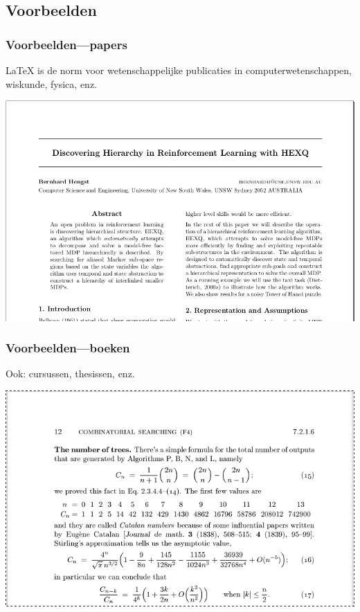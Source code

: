 \documentclass{beamer}
\begin{document}
\begin{frame}
\begin{columns}[c]
  \end{columns}
\end{frame}

\subsection{Voorbeelden}

\begin{frame}
  \frametitle{Voorbeelden---papers}

  {\LaTeX} is de norm voor wetenschappelijke publicaties in computerwetenschappen, wiskunde, fysica, enz.

  \begin{center}
  \includegraphics[height=.6\textheight]{img/oef1-03}
  \end{center}

\end{frame}

\begin{frame}
  \frametitle{Voorbeelden---boeken}

  Ook: cursussen, thesissen, enz.

  \begin{center}
	\includegraphics[height=.6\textheight]{img/oef1-04}
  \end{center}

\end{frame}
\end{document}

